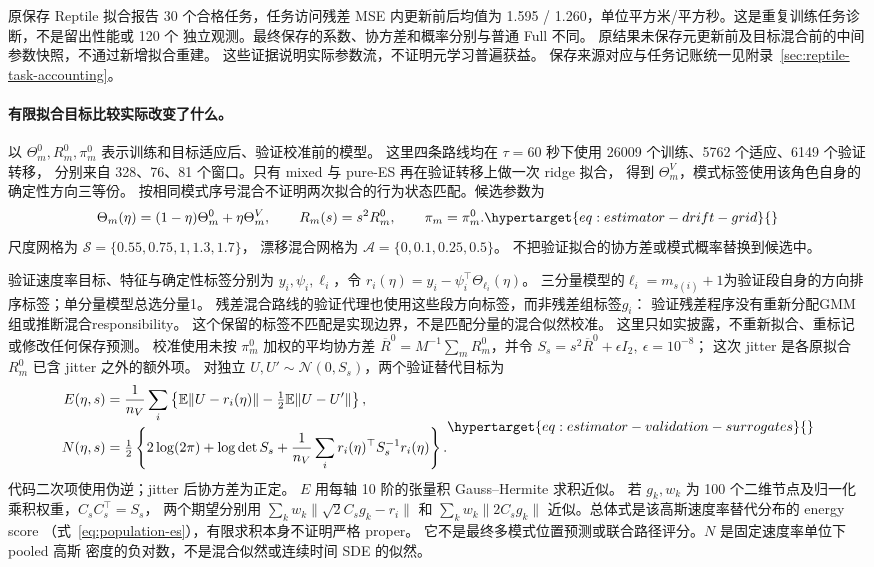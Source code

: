 原保存 Reptile 拟合报告 30 个合格任务，任务访问残差 MSE 内更新前后均值为
1.595 / 1.260，单位平方米/平方秒。这是重复训练任务诊断，不是留出性能或 120 个
独立观测。最终保存的系数、协方差和概率分别与普通 Full 不同。
原结果未保存元更新前及目标混合前的中间参数快照，不通过新增拟合重建。
这些证据说明实际参数流，不证明元学习普遍获益。
保存来源对应与任务记账统一见附录~\ref{sec:reptile-task-accounting}。

\paragraph{有限拟合目标比较实际改变了什么。}
\label{sec:estimator-calibration}\hypertarget{sec:estimator-calibration}{}
以 \(\Theta_m^0,R_m^0,\pi_m^0\) 表示训练和目标适应后、验证校准前的模型。
这里四条路线均在 \(\tau=60\) 秒下使用 26009 个训练、5762 个适应、6149 个验证转移，
分别来自 328、76、81 个窗口。只有 mixed 与 pure-ES 再在验证转移上做一次 ridge 拟合，
得到 \(\Theta_m^V\)，模式标签使用该角色自身的确定性方向三等份。
按相同模式序号混合不证明两次拟合的行为状态匹配。候选参数为
\begin{equation}
\Theta_m(\eta)=(1-\eta)\Theta_m^0+\eta\Theta_m^V,\qquad
R_m(s)=s^2R_m^0,\qquad \pi_m=\pi_m^0 .
\label{eq:estimator-drift-grid}\hypertarget{eq:estimator-drift-grid}{}
\end{equation}
尺度网格为 \(\mathcal S=\{0.55,0.75,1,1.3,1.7\}\)，
漂移混合网格为 \(\mathcal A=\{0,0.1,0.25,0.5\}\)。
不把验证拟合的协方差或模式概率替换到候选中。

验证速度率目标、特征与确定性标签分别为 \(y_i,\psi_i,\ell_i\)，令
\(r_i(\eta)=y_i-\psi_i^\top\Theta_{\ell_i}(\eta)\)。
三分量模型的\(\ell_i=m_{s(i)}+1\)为验证段自身的方向排序标签；单分量模型总选分量1。
残差混合路线的验证代理也使用这些段方向标签，而非残差组标签\(g_i\)：
验证残差程序没有重新分配GMM组或推断混合responsibility。
这个保留的标签不匹配是实现边界，不是匹配分量的混合似然校准。
这里只如实披露，不重新拟合、重标记或修改任何保存预测。
校准使用未按 \(\pi_m^0\) 加权的平均协方差
\(\overline R^0=M^{-1}\sum_mR_m^0\)，并令
\(S_s=s^2\overline R^0+\epsilon I_2,\ \epsilon=10^{-8}\)；
这次 jitter 是各原拟合 \(R_m^0\) 已含 jitter 之外的额外项。
对独立 \(U,U'\sim\mathcal N(0,S_s)\)，两个验证替代目标为
\begin{equation}
\begin{aligned}
E(\eta,s)&=\frac1{n_V}\sum_i
 \left\{\mathbb E\|U-r_i(\eta)\|-\tfrac12\mathbb E\|U-U'\|\right\},\\
N(\eta,s)&=\tfrac12\left\{2\log(2\pi)+\log\det S_s
 +\frac1{n_V}\sum_i r_i(\eta)^\top S_s^{-1}r_i(\eta)\right\}.
\end{aligned}
\label{eq:estimator-validation-surrogates}\hypertarget{eq:estimator-validation-surrogates}{}
\end{equation}
代码二次项使用伪逆；jitter 后协方差为正定。
\(E\) 用每轴 10 阶的张量积 Gauss--Hermite 求积近似。
若 \(g_k,w_k\) 为 100 个二维节点及归一化乘积权重，\(C_sC_s^\top=S_s\)，
两个期望分别用 \(\sum_kw_k\|\sqrt2C_sg_k-r_i\|\) 和
\(\sum_kw_k\|2C_sg_k\|\) 近似。总体式是该高斯速度率替代分布的 energy score
（式~\eqref{eq:population-es}），有限求积本身不证明严格 proper。
它不是最终多模式位置预测或联合路径评分。\(N\) 是固定速度率单位下 pooled 高斯
密度的负对数，不是混合似然或连续时间 SDE 的似然。


